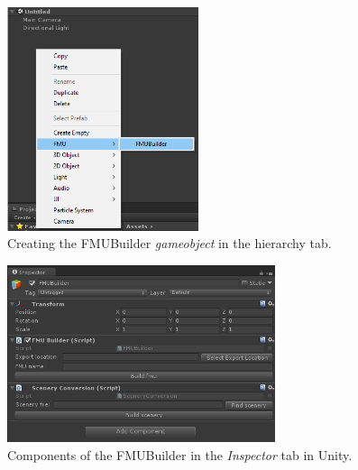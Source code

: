\begin{figure}[ht]
	\centerline{\includegraphics[width=0.5\textwidth]{figures/20sim_Unity3.png}}
	\caption{Creating the FMUBuilder \textit{gameobject} in the hierarchy tab.}
	\label{figure:20-sim_unity_create_fmubuilder}
\end{figure}

\begin{figure}[ht]
	\centerline{\includegraphics[width=0.7\textwidth]{figures/20sim_Unity4.png}}
	\caption{Components of the FMUBuilder in the \emph{Inspector} tab in Unity.}
	\label{figure:20-sim_unity_components_fmubuilder}
\end{figure}

